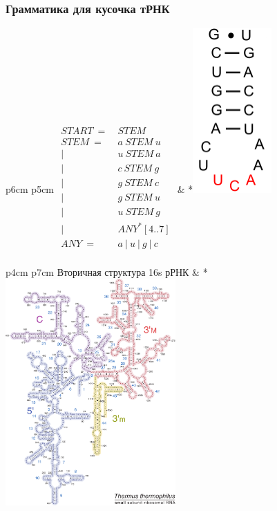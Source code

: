\documentclass{beamer}
\begin{document}
    \begin{frame}
        \frametitle{Грамматика для кусочка тРНК}
        \begin{tabular}{p{6cm} p{5cm}}
            {$\begin{aligned}
                START\ =&\ STEM \\
                STEM\ =&\ a\ STEM\ u \\
                |&\ u\ STEM\ a \\
                |&\ c\ STEM\ g \\
                |&\ g\ STEM\ c \\
                |&\ g\ STEM\ u \\
                |&\ u\ STEM\ g \\
                |&\ ANY^{*}[4..7] \\
                ANY\ =&\ a\ |\ u\ |\ g\ |\ c \\
                \end{aligned}$}
            &
            *{\includegraphics[width=3cm]{pictures/TRNAPart.png}}
        \end{tabular}
    \end{frame}
    
    \begin{frame}
        \begin{tabular}{p{4cm} p{7cm}}
            Вторичная структура 16s рРНК
            &
            *{\includegraphics[width=6.5cm]{pictures/thermus_16s_2ndry.pdf}}
        \end{tabular}
    \end{frame}
    
\end{document}

